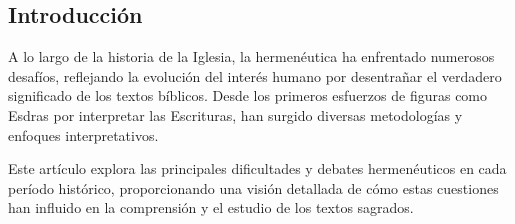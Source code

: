 \begin{multicols}{2}
\tableofcontents

\section{Introducción}

A lo largo de la historia de la Iglesia, la hermenéutica ha enfrentado numerosos desafíos, reflejando la evolución del interés humano por desentrañar el verdadero significado de los textos bíblicos. Desde los primeros esfuerzos de figuras como Esdras por interpretar las Escrituras, han surgido diversas metodologías y enfoques interpretativos.

Este artículo explora las principales dificultades y debates hermenéuticos en cada período histórico, proporcionando una visión detallada de cómo estas cuestiones han influido en la comprensión y el estudio de los textos sagrados.

\end{multicols}
